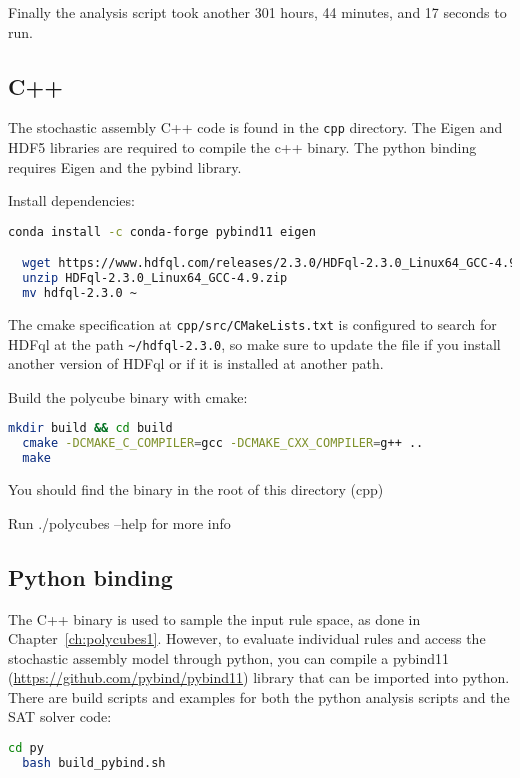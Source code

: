 Finally the analysis script took another 301 hours, 44 minutes, and 17 seconds to run.


\subsection{C++}
The stochastic assembly C++ code is found in the \texttt{cpp} directory. The Eigen and HDF5 libraries are required to compile the c++ binary. The python binding requires Eigen and the pybind library.

Install dependencies:
\begin{lstlisting}[language=bash]
  conda install -c conda-forge pybind11 eigen

  wget https://www.hdfql.com/releases/2.3.0/HDFql-2.3.0_Linux64_GCC-4.9.zip
  unzip HDFql-2.3.0_Linux64_GCC-4.9.zip
  mv hdfql-2.3.0 ~
\end{lstlisting}

The cmake specification at \texttt{cpp/src/CMakeLists.txt} is configured to search for HDFql at the path \texttt{\textasciitilde/hdfql-2.3.0}, so make sure to update the file if you install another version of HDFql or if it is installed at another path.

Build the polycube binary with cmake:
\begin{lstlisting}[language=bash]
  mkdir build && cd build
  cmake -DCMAKE_C_COMPILER=gcc -DCMAKE_CXX_COMPILER=g++ ..
  make
\end{lstlisting}

You should find the binary in the root of this directory (cpp)

Run ./polycubes --help for more info

\subsection{Python binding}
The C++ binary is used to sample the input rule space, as done in Chapter~\ref{ch:polycubes1}. However, to evaluate individual rules and access the stochastic assembly model through python, you can compile a pybind11 (\url{https://github.com/pybind/pybind11}) library that can be imported into python. There are build scripts and examples for both the python analysis scripts and the SAT solver code:

\begin{lstlisting}[language=bash]
  cd py
  bash build_pybind.sh
\end{lstlisting}

